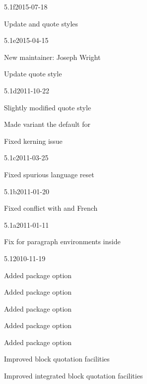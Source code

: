 \documentclass{ltxdockit}[2010/09/26]
\begin{document}
\begin{changelog}
\begin{release}{5.1f}{2015-07-18}
\item Update  and  quote styles
\end{release}

\begin{release}{5.1e}{2015-04-15}
\item New maintainer: Joseph Wright
\item Update  quote style
\end{release}

\begin{release}{5.1d}{2011-10-22}
\item Slightly modified quote style 
\item Made variant  the default for 
\item Fixed \xetex kerning issue
\end{release}

\begin{release}{5.1c}{2011-03-25}
\item Fixed spurious language reset
\end{release}

\begin{release}{5.1b}{2011-01-20}
\item Fixed conflict with  and French
\end{release}

\begin{release}{5.1a}{2011-01-11}
\item Fix for paragraph environments inside 
\end{release}

\begin{release}{5.1}{2010-11-19}
\item Added package option 
\item Added package option 
\item Added package option 
\item Added package option 
\item Added package option 
\item Improved block quotation facilities
\item Improved integrated block quotation facilities
\end{release}


\end{changelog}
\end{document}
